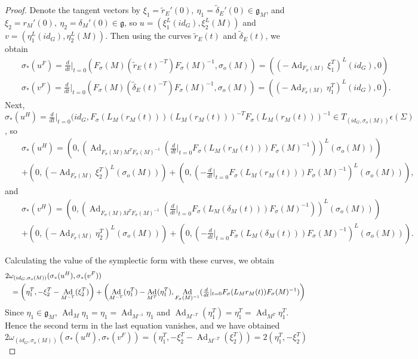 \documentclass[a4paper,12pt,leqno]{amsart}
\numberwithin{equation}{section}
\theoremstyle{plain}
\theoremstyle{definition}
\DeclareMathOperator{\Ad}{Ad}
\newcommand{\fg}{\mathfrak{g}}
\begin{document}
\begin{proof}
Denote the tangent vectors by $\xi_1=\tilde{r}_E'(0),~\eta_1=\tilde{\delta}_E'(0)\in \fg_M$, and $\xi_2=r_M'(0), ~\eta_2=\delta_M'(0)\in\fg$, so $u=( \xi_1^L(id_G),\xi_2^L(M) )$ and $v=(\eta_1^L(id_G),\eta^L_2(M))$.
Then using the curves $\tilde{r}_E(t)$ and $\tilde{\delta}_E(t)$, we obtain
\begin{eqnarray*}
&&\sigma_*(u^F)=\tfrac{d}{dt}|_{t=0} \left( F_\sigma(M)(\tilde{r}_E(t)^{-T})F_\sigma(M)^{-1},  \sigma_o(M) \right)=\left( (-\Ad_{F_\sigma(M)} \xi_1^T)^L (id_G), 0 \right) \\
&&\sigma_*(v^F)=\tfrac{d}{dt}|_{t=0} \left( F_\sigma(M)(\tilde{\delta}_E(t)^{-T})F_\sigma(M)^{-1},  \sigma_o(M) \right)=\left( (-\Ad_{F_\sigma(M)}\eta_1^T)^L(id_G),0 \right).
\end{eqnarray*}
Next, $\sigma_*(u^H)=\frac{d}{dt}|_{t=0} (id_G, F_\sigma(L_M(r_M(t))) (L_M(r_M(t)))^{-T} F_\sigma(L_M(r_M(t)))^{-1} \in T_{(id_G,\sigma_o(M))}\epsilon(\Sigma)$, so
\begin{eqnarray*}
&&\sigma_*(u^H)=\left( 0, \left(\Ad_{F_\sigma(M) M^T F_\sigma(M)^{-1}}( \tfrac{d}{dt}|_{t=0}F_\sigma(L_M(r_M(t)))F_\sigma(M)^{-1}) \right)^L (\sigma_o(M)) \right) \\&&
+ \left( 0, \left( -\Ad_{F_\sigma(M)}\xi_2^T \right)^L(\sigma_o(M) ) \right) + \left( 0,\left( -\tfrac{d}{dt}|_{t=0}F_\sigma(L_M(r_M(t)))F_\sigma(M)^{-1} \right)^L( \sigma_o(M) ) \right),
\end{eqnarray*}
and
\begin{eqnarray*}
&&\sigma_*(v^H)=\left( 0, \left(\Ad_{F_\sigma(M)M^TF_\sigma(M)^{-1}}( \tfrac{d}{dt}|_{t=0}F_\sigma(L_M(\delta_M(t)))F_\sigma(M)^{-1}) \right)^L (\sigma_o(M) ) \right) \\&&
+ \left( 0, \left(-\Ad_{F_\sigma(M)}\eta_2^T\right)^L(\sigma_o(M) )\right) + \left( 0, \left(-\tfrac{d}{dt}|_{t=0}F_\sigma(L_M(\delta_M(t)))F_\sigma(M)^{-1} \right)^L( \sigma_o(M) ) \right).
\end{eqnarray*}

Calculating the value of the symplectic form with these curves, we obtain
\begin{eqnarray*}
\lefteqn{2 \omega_{(id_G,\sigma_o(M))}(\sigma_*(u^H),\sigma_*(v^F)) }\\
&&=\left( \eta_1^T,-\xi_2^T-\Ad_{M^{-T}}(\xi_2^T) \right)+\left( \Ad_{M^{-T}} (\eta_1^T) -\Ad_{M^T} (\eta_1^T), \Ad_{F_\sigma(M)^{-1}}( \tfrac{d}{dt}|_{t=0} F_\sigma(L_Mr_M(t))F_\sigma(M)^{-1}) \right)
\end{eqnarray*}
Since $\eta_1\in\fg_M$, $\Ad_M\eta_1=\eta_1=\Ad_{M^{-1}}\eta_1$ and $\Ad_{M^{-T}}(\eta_1^T)=\eta_1^T=\Ad_{M^T}\eta^T_1$. 
Hence the second term in the last equation vanishes, and we have obtained
\begin{equation}\label{eq:sigma_uHvF}
2\omega_{(id_G,\sigma_o(M) )}(\sigma_*(u^H),\sigma_*(v^F))=(\eta_1^T,-\xi_2^T-\Ad_{M^{-T}}(\xi_2^T) )=2(\eta_1^T, -\xi_2^T)
\end{equation}


\end{proof}
\end{document}
